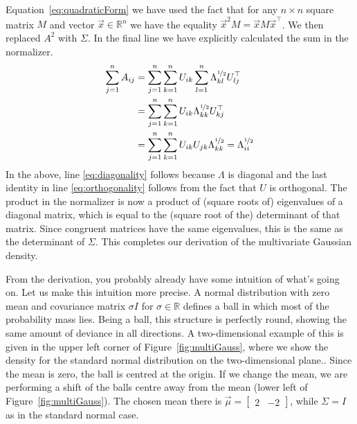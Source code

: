 \documentclass[a4paper,11pt,leqno]{report}\usepackage[]{graphicx}\usepackage[]{color}
\begin{document}
Equation~\eqref{eq:quadraticForm} we have 
used the fact that for any $ n\times n $ square matrix $ M $ and vector $ \vec{x} \in \mathbb{R}^{n} $ we have the equality $ \vec{x}^{2}M = \vec{x}M\vec{x}^{\top} $.
We then replaced $ A^{2} $ with $ \Sigma $. In the final line we have explicitly calculated the sum in the normalizer.
\begin{align}
\sum_{j=1}^{n}A_{ij} &= \sum_{j=1}^{n} \sum_{k=1}^{n} U_{ik} \sum_{l=1}^{n} \Lambda^{\nicefrac{1}{2}}_{kl} U^{\top}_{lj} \\
&= \sum_{j=1}^{n} \sum_{k=1}^{n} U_{ik} \Lambda^{\nicefrac{1}{2}}_{kk} U^{\top}_{kj} \label{eq:diagonality} \\
&= \sum_{j=1}^{n} \sum_{k=1}^{n} U_{ik} U_{jk} \Lambda_{kk}^{\nicefrac{1}{2}} = \Lambda_{ii}^{\nicefrac{1}{2}} \label{eq:orthogonality}
\end{align}
In the above, line \eqref{eq:diagonality} follows because $ \Lambda $ is diagonal and the last identity in line \eqref{eq:orthogonality} follows from the fact that
$ U $ is orthogonal. The product in the normalizer is now a product of (square roots of) eigenvalues of a diagonal matrix, which is equal to the (square root of the) 
determinant of that matrix. Since congruent matrices have the same eigenvalues, this is the same as the determinant of $ \Sigma $. This completes our derivation of the multivariate Gaussian density.

From the derivation, you probably already have some intuition of what's going on. Let us make this intuition more precise. A normal distribution with zero mean
and covariance matrix $ \sigma I $ for $ \sigma \in \mathbb{R} $ defines a ball in which most of the probability mass lies. Being a ball, this structure is perfectly
round, showing the same amount of deviance in all directions. A two-dimensional example of this is given in the upper left corner of Figure~\ref{fig:multiGauss}, where
we show the density for the standard normal distribution on the two-dimensional plane.. 
Since the mean is zero, the ball is centred at the origin. If we change the mean, we are 
performing a shift of the balls centre away from the mean (lower left of Figure~\ref{fig:multiGauss}). The chosen mean there is 
$ \vec{\mu} = \begin{bmatrix}
2 & -2
\end{bmatrix} $, while $ \Sigma = I $ as in the standard normal case.
\end{document}
